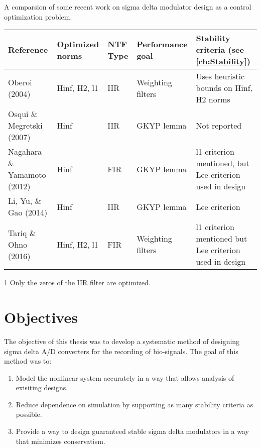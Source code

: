 \begin{threeparttable}
	\caption{A comparsion of some recent work on sigma delta modulator design as a control optimization problem.} \label{tab:related}
	\begin{tabularx}{\textwidth}{X P{1.9cm} P{0.6cm} P{1.9cm} P{3.2cm}}
		\toprule
		\textbf{Reference} & \textbf{Optimized norms} & \textbf{\gls{NTF} Type} & \textbf{Performance goal} & \textbf{Stability criteria (see \autoref{ch:Stability})} \\
		\midrule
		Oberoi (2004) \cite{Oberoi2004} & \gls{Hinf}, \gls{H2}, \gls{l1} &\gls{IIR} &  Weighting filters & Uses heuristic bounds on \gls{Hinf}, \gls{H2} norms \\
		Osqui \& Megretski (2007) \cite{Osqui2007} & \gls{Hinf} & \gls{IIR} & \gls{GKYP} lemma & Not reported \\
		Nagahara \& Yamamoto (2012) \cite{Nagahara2012} & \gls{Hinf} & \gls{FIR} & \gls{GKYP} lemma & \gls{l1} criterion mentioned, but Lee criterion used in design \\
		Li, Yu, \& Gao (2014) \cite{Li2014} & \gls{Hinf} & \gls{IIR} & \gls{GKYP} lemma & Lee criterion \\
		Tariq \& Ohno (2016) \cite{Tariq2016} & \gls{Hinf}, \gls{H2}, \gls{l1} & \gls{FIR} & Weighting filters & \gls{l1} criterion mentioned but Lee criterion used in design \\
		\bottomrule
	\end{tabularx}
	\begin{tablenotes}
		\item[1] Only the zeros of the \gls{IIR} filter are optimized.
	\end{tablenotes}
	
\end{threeparttable}

\section{Objectives}
\label{sec:in-obj}

The objective of this thesis was to develop a systematic method of designing sigma delta \gls{A/D} converters for the recording of bio-signals. The goal of this method was to:

\begin{enumerate}
	\item Model the nonlinear system accurately in a way that allows analysis of exisiting designs.
	\item Reduce dependence on simulation by supporting as many stability criteria as possible.
	\item Provide a way to design guaranteed stable sigma delta modulators in a way that minimizes conservatism.
\end{enumerate}

